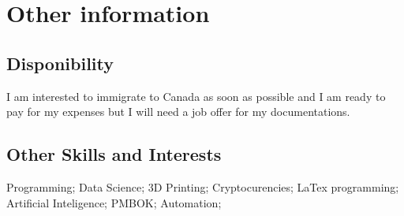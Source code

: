 \documentclass[letterpaper]{twentysecondcv} %
\begin{document}

\section{Other information}
\subsection{Disponibility}
I am interested to immigrate to Canada as soon as possible and I am ready to pay for my expenses but I will need a job offer for my documentations.
\subsection{Other Skills and Interests}
Programming; Data Science; 3D Printing; Cryptocurencies; LaTex programming; Artificial Inteligence; PMBOK; Automation;






\end{document}
